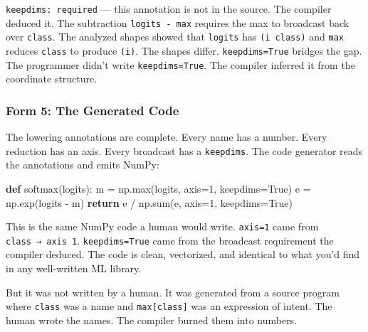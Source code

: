\documentclass[11pt,titlepage]{article}
\newenvironment{Shaded}{}{}
\newcommand{\BuiltInTok}[1]{#1}
\newcommand{\ControlFlowTok}[1]{\textcolor[rgb]{0.00,0.44,0.13}{\textbf{#1}}}
\newcommand{\DecValTok}[1]{\textcolor[rgb]{0.25,0.63,0.44}{#1}}
\newcommand{\KeywordTok}[1]{\textcolor[rgb]{0.00,0.44,0.13}{\textbf{#1}}}
\newcommand{\NormalTok}[1]{#1}
\newcommand{\OperatorTok}[1]{\textcolor[rgb]{0.40,0.40,0.40}{#1}}
\newcommand{\VariableTok}[1]{\textcolor[rgb]{0.10,0.09,0.49}{#1}}
\begin{document}
\texttt{keepdims:\ required} --- this annotation is not in the source.
The compiler deduced it. The subtraction \texttt{logits\ -\ max}
requires the max to broadcast back over \texttt{class}. The analyzed
shapes showed that \texttt{logits} has \texttt{(i\ class)} and
\texttt{max} reduces \texttt{class} to produce \texttt{(i)}. The shapes
differ. \texttt{keepdims=True} bridges the gap. The programmer didn't
write \texttt{keepdims=True}. The compiler inferred it from the
coordinate structure.

\vspace{2em}

\hypertarget{form-5-the-generated-code}{%
\subsubsection{Form 5: The Generated
Code}\label{form-5-the-generated-code}}

The lowering annotations are complete. Every name has a number. Every
reduction has an axis. Every broadcast has a \texttt{keepdims}. The code
generator reads the annotations and emits NumPy:

\begin{Shaded}
\begin{Highlighting}[]
\KeywordTok{def}\NormalTok{ softmax(logits):}
\NormalTok{    m }\OperatorTok{=}\NormalTok{ np.}\BuiltInTok{max}\NormalTok{(logits, axis}\OperatorTok{=}\DecValTok{1}\NormalTok{, keepdims}\OperatorTok{=}\VariableTok{True}\NormalTok{)}
\NormalTok{    e }\OperatorTok{=}\NormalTok{ np.exp(logits }\OperatorTok{-}\NormalTok{ m)}
    \ControlFlowTok{return}\NormalTok{ e }\OperatorTok{/}\NormalTok{ np.}\BuiltInTok{sum}\NormalTok{(e, axis}\OperatorTok{=}\DecValTok{1}\NormalTok{, keepdims}\OperatorTok{=}\VariableTok{True}\NormalTok{)}
\end{Highlighting}
\end{Shaded}

This is the same NumPy code a human would write. \texttt{axis=1} came
from \texttt{class\ →\ axis\ 1}. \texttt{keepdims=True} came from the
broadcast requirement the compiler deduced. The code is clean,
vectorized, and identical to what you'd find in any well-written ML
library.

But it was not written by a human. It was generated from a source
program where \texttt{class} was a name and \texttt{max{[}class{]}} was
an expression of intent. The human wrote the names. The compiler burned
them into numbers.

\vspace{2em}
\end{document}
